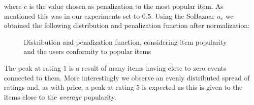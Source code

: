 where $c$ is the value chosen as penalization to the most popular item. As
mentioned this was in our experiments set to $0.5$. Using the SoBazaar $a_e$ we
obtained the following distribution and penalization function after
normalization:

\begin{figure}[H]
  \begin{subfigure}[b]{0.56\textwidth}
    \centering
  \end{subfigure}
  \begin{subfigure}[b]{0.5\textwidth}
    \centering
  \end{subfigure}
  \caption{Distribution and penalization function, considering item popularity
  and the users conformity to popular items}
  \label{fig:dist-popularity}
\end{figure}

The peak at rating $1$ is a result of many items having close to zero events
connected to them. More interestingly we observe an evenly distributed spread
of ratings and, as with price, a peak at rating $5$ is expected as this is
given to the items close to the \textit{average} popularity.

